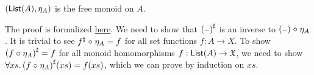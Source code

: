 \begin{propositionrep}
    $(\operatorname{\mathsf{List}}(A),\eta_A)$ is the free monoid on $A$.
\end{propositionrep}

\begin{proofsketch}
    The proof is formalized \href{https://windtfw.com/agda-symmetries/Cubical.Structures.Set.Mon.List.html#2239}{here}.
    We need to show that ${({\scriptstyle{-}})}^{\sharp}$ is an inverse to $({\scriptstyle{-}}) \mathrel{\circ} \eta_A$.
    It is trivial to see ${f}^{\sharp} \mathrel{\circ} \eta_A = f$ for all set functions $f : A \to X$.
    To show ${(f \mathrel{\circ} \eta_A)}^{\sharp} = f$ for all monoid homomorphisms $f : \operatorname{\mathsf{List}}(A) \to \mathfrak{X}$,
    we need to show $\forall xs.\, {(f \mathrel{\circ} \eta_A)}^{\sharp}(xs) = f(xs)$, which we can prove by induction on $xs$.
\end{proofsketch}


